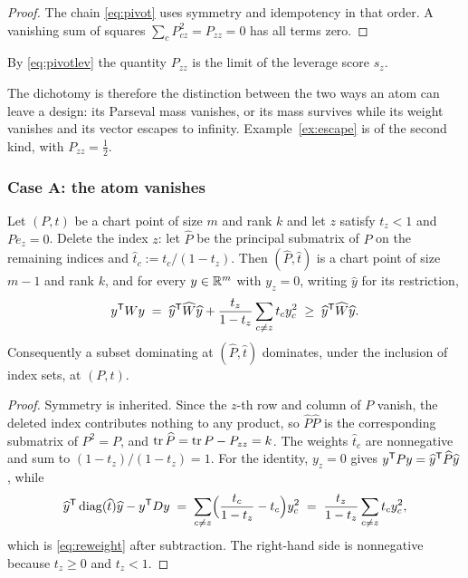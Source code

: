 \begin{proof}
The chain \eqref{eq:pivot} uses symmetry and idempotency in that order.
A vanishing sum of squares $\sum_cP_{cz}^{2}=P_{zz}=0$ has all terms
zero.
\end{proof}

By \eqref{eq:pivotlev} the quantity $P_{zz}$ is the limit of the leverage
score $s_z$.

The dichotomy is therefore the distinction between the two ways an atom
can leave a design: its Parseval mass vanishes, or its mass survives
while its weight vanishes and its vector escapes to infinity.
Example~\ref{ex:escape} is of the second kind, with $P_{zz}=\tfrac12$.

\subsubsection*{Case A: the atom vanishes}

\begin{lemma}[Lean]\label{lem:delete}
Let $(P,t)$ be a chart point of size $m$ and rank $k$ and let $z$ satisfy
$t_z<1$ and $Pe_z=0$.  Delete the index $z$: let $\widehat P$ be the
principal submatrix of $P$ on the remaining indices and
$\widehat t_c:=t_c/(1-t_z)$.  Then $(\widehat P,\widehat t)$ is a chart
point of size $m-1$ and rank $k$, and for every $y\in\mathbb{R}^m$ with $y_z=0$,
writing $\widehat y$ for its restriction,
\begin{equation}\label{eq:reweight}
  y^{\mathsf{T}} Wy\;=\;\widehat y^{\mathsf{T}}\widehat W\widehat y
    +\frac{t_z}{1-t_z}\sum_{c\ne z}t_cy_c^{2}
  \;\ge\;\widehat y^{\mathsf{T}}\widehat W\widehat y .
\end{equation}
Consequently a subset dominating at $(\widehat P,\widehat t)$ dominates,
under the inclusion of index sets, at $(P,t)$.
\end{lemma}

\begin{proof}
Symmetry is inherited.  Since the $z$-th row and column of $P$ vanish,
the deleted index contributes nothing to any product, so
$\widehat P\widehat P$ is the corresponding submatrix of $P^{2}=P$, and
$\operatorname{tr}\widehat P=\operatorname{tr} P-P_{zz}=k$.  The weights $\widehat t_c$ are
nonnegative and sum to $(1-t_z)/(1-t_z)=1$.  For the identity, $y_z=0$
gives $y^{\mathsf{T}} Py=\widehat y^{\mathsf{T}}\widehat P\widehat y$, while
\[
  \widehat y^{\mathsf{T}}\operatorname{diag}(\widehat t)\widehat y-y^{\mathsf{T}} Dy
  \;=\;\sum_{c\ne z}\Bigl(\frac{t_c}{1-t_z}-t_c\Bigr)y_c^{2}
  \;=\;\frac{t_z}{1-t_z}\sum_{c\ne z}t_cy_c^{2},
\]
which is \eqref{eq:reweight} after subtraction.  The right-hand side is
nonnegative because $t_z\ge0$ and $t_z<1$.
\end{proof}

